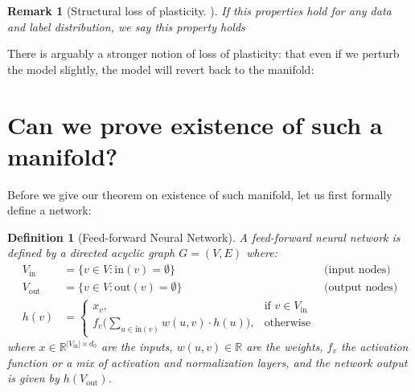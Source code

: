 \documentclass[11pt]{article}
\newtheorem{definition}{Definition}[section]
\newtheorem{remark}{Remark}[section]
\begin{document}
\begin{remark}[Structural loss of plasticity. ]
If this properties hold for \emph{any} data and label distribution, we say this property holds 
\end{remark}



There is arguably a stronger notion of loss of plasticity: that even if we perturb the model slightly, the model will revert back to the manifold:



\section{Can we prove existence of such a manifold?}


Before we give our theorem on existence of such manifold, let us first formally define a network: 


\begin{definition}[Feed-forward Neural Network]
    A feed-forward neural network is defined by a directed acyclic graph $G = (V, E)$ where:
    \begin{align}
        V_{\text{in}} &= \{v \in V : \text{in}(v) = \emptyset\} & \text{(input nodes)} \\
        V_{\text{out}} &= \{v \in V : \text{out}(v) = \emptyset\} & \text{(output nodes)} \\
        h(v) &= 
        \begin{cases}
            x_v, & \text{if } v \in V_{\text{in}} \\
            f_v\Big(\sum_{u \in \text{in}(v)} w(u, v) \cdot h(u)\Big), & \text{otherwise}
        \end{cases}
    \end{align}
    where $x \in \mathbb{R}^{|V_{\text{in}}| \times d_0}$ are the inputs, $w(u, v) \in \mathbb{R}$ are the weights, $f_v$ the activation function or a mix of activation and normalization layers, and the network output is given by $h(V_{\text{out}})$.
\end{definition}
\end{document}
